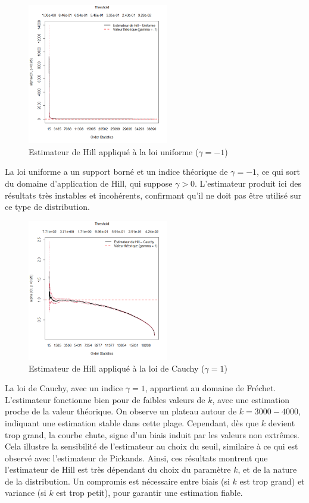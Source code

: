 \documentclass{article}
\theoremstyle{plain}
\theoremstyle{definition}
\theoremstyle{plain}
\begin{document}
\begin{figure}[H]
    \centering
    \includegraphics[width=0.55\textwidth]{./Evolution des estimateurs/hill/estimateur_hill_uniforme.png}
    \caption{Estimateur de Hill appliqué à la loi uniforme ($\gamma = -1$)}
\end{figure}
La loi uniforme a un support borné et un indice théorique de \(\gamma = -1\), ce qui sort du domaine d’application de Hill, qui suppose \(\gamma > 0\). L’estimateur produit ici des résultats très instables et incohérents, confirmant qu’il ne doit pas être utilisé sur ce type de distribution.

\begin{figure}[H]
    \centering
    \includegraphics[width=0.55\textwidth]{./Evolution des estimateurs/hill/estimateur_hill_cauchy.png}
    \caption{Estimateur de Hill appliqué à la loi de Cauchy ($\gamma = 1$)}
\end{figure}
La loi de Cauchy, avec un indice $\gamma = 1$, appartient au domaine de Fréchet. L’estimateur fonctionne bien pour de faibles valeurs de $k$, avec une estimation proche de la valeur théorique. On observe un plateau autour de $k = 3000-4000$, indiquant une estimation stable dans cette plage. Cependant, dès que $k$ devient trop grand, la courbe chute, signe d’un biais induit par les valeurs non extrêmes. Cela illustre la sensibilité de l’estimateur au choix du seuil, similaire à ce qui est observé avec l'estimateur de Pickands.
\medskip
\noindent
Ainsi, ces résultats montrent que l’estimateur de Hill est très dépendant du choix du paramètre \(k\), et de la nature de la distribution. Un compromis est nécessaire entre biais (si \(k\) est trop grand) et variance (si \(k\) est trop petit), pour garantir une estimation fiable.
\end{document}
